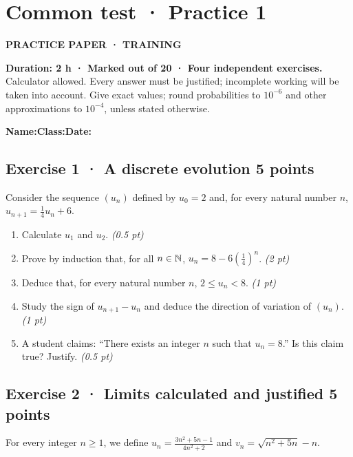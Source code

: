 \clearpage{}\label{sujet:3-1}

\section*{Common test · Practice 1}

{\sffamily\bfseries\color{teal}PRACTICE PAPER · TRAINING\par}

\textbf{Duration: 2 h · Marked out of 20 · Four independent exercises.}\\Calculator allowed. Every answer must be justified; incomplete working will be taken into account. Give exact values; round probabilities to $10^{-6}$ and other approximations to $10^{-4}$, unless stated otherwise.

\smallskip\textbf{Name:}\enspace\dotfill\quad\textbf{Class:}\enspace\dotfill\quad\textbf{Date:}\enspace\dotfill

\subsection*{Exercise 1 · A discrete evolution \hfill 5 points}Consider the sequence $(u_n)$ defined by $u_0=2$ and, for every natural number $n$, $u_{n+1}=\frac{1}{4}u_n+6$.

\begin{enumerate}

\item Calculate $u_1$ and $u_2$. \hfill\textit{(0.5 pt)}

\item Prove by induction that, for all $n\in\mathbb N$, $u_n=8-6\left(\frac{1}{4}\right)^n$. \hfill\textit{(2 pt)}

\item Deduce that, for every natural number $n$, $2\le u_n<8$. \hfill\textit{(1 pt)}

\item Study the sign of $u_{n+1}-u_n$ and deduce the direction of variation of $(u_n)$. \hfill\textit{(1 pt)}

\item A student claims: ``There exists an integer $n$ such that $u_n=8$.'' Is this claim true? Justify. \hfill\textit{(0.5 pt)}

\end{enumerate}

\subsection*{Exercise 2 · Limits calculated and justified \hfill 5 points}For every integer $n\ge1$, we define $u_n=\frac{3n^2+5n-1}{4n^2+2}$ and $v_n=\sqrt{n^2+5n}-n$.

